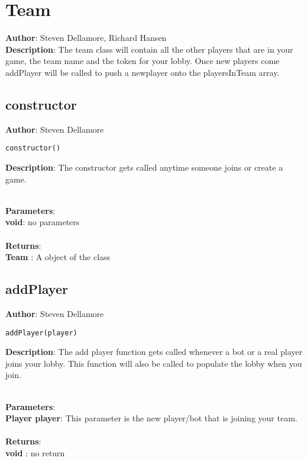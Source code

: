\documentclass[12pt]{article}
\begin{document}
\section{Team}
\textbf{Author}: Steven Dellamore, Richard Hansen \\
\textbf{Description}: The team class will contain all the other players that are in your game, the team name and the token for your lobby. Once new players come addPlayer will be called to push a newplayer onto the playersInTeam array. \\



\subsection{constructor}
\textbf{Author}: Steven Dellamore 
\vspace*{1\baselineskip}
\begin{lstlisting}
constructor()
\end{lstlisting} 
\vspace*{1\baselineskip}
\textbf{Description}: The constructor gets called anytime someone joins or create a game. 


\textbf{\large{\\Parameters}}:\\
\textbf{void}: no parameters\\\textbf{\large{\\Returns}}:\\\textbf{Team }: A object of the class

\subsection{addPlayer}
\textbf{Author}: Steven Dellamore 
\vspace*{1\baselineskip}
\begin{lstlisting}
addPlayer(player)
\end{lstlisting} 
\vspace*{1\baselineskip}
\textbf{Description}: The add player function gets called whenever a bot or a real player joins your lobby. This function will also be called to populate the lobby when you join. 


\textbf{\large{\\Parameters}}:\\
\textbf{Player player}: This parameter is the new player/bot that is joining your team.\\\textbf{\large{\\Returns}}:\\\textbf{void }: no return
\end{document}
